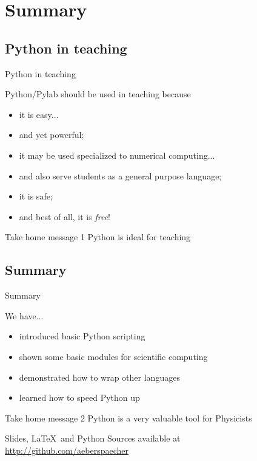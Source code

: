 \section{Summary}

\subsection{Python in teaching}

\begin{frame}{Python in teaching}

Python/Pylab should be used in teaching because

\begin{itemize}
	\item it is easy...
	\item and yet powerful;
	\item it may be used specialized to numerical computing...
	\item and also serve students as a general purpose language;
	\item it is safe;
	\item and best of all, it is \emph{free}!
\end{itemize}

\begin{alertbbox}{Take home message 1}
Python is ideal for teaching
\end{alertbbox}

\end{frame}

\subsection{Summary}

\begin{frame}{Summary}

We have...

\begin{itemize}
	\item introduced basic Python scripting
	\item shown some basic modules for scientific computing
	\item demonstrated how to wrap other languages
	\item learned how to speed Python up
\end{itemize}

\begin{alertbbox}{Take home message 2}
Python is a very valuable tool for Physicists
\end{alertbbox}

Slides, \LaTeX~and Python Sources available at\\
\url{http://github.com/aeberspaecher}

\end{frame}
